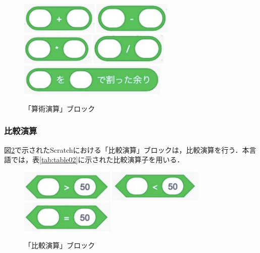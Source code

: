 \documentclass[10pt,a4j]{ltjsarticle}
\begin{document}
\begin{figure}[H]
  \centering
  \includegraphics[height=15mm]{images/add.pdf}
  \includegraphics[height=15mm]{images/sub.pdf} \\
  \includegraphics[height=15mm]{images/mul.pdf}
  \includegraphics[height=15mm]{images/div.pdf} \\
  \includegraphics[height=15mm]{images/rem.pdf}
  \caption{「算術演算」ブロック}
  \label{fig:math}
\end{figure}

\subsubsection{比較演算}
図\ref{fig:com}で示されたScratchにおける「比較演算」ブロックは，比較演算を行う．本言語では，表\ref{tab:table02}に示された比較演算子を用いる．

\begin{figure}[H]
  \centering
  \includegraphics[height=15mm]{images/over.pdf}
  \includegraphics[height=15mm]{images/less.pdf}
  \includegraphics[height=15mm]{images/equ.pdf}
  \caption{「比較演算」ブロック}
  \label{fig:com}
\end{figure}
\end{document}
